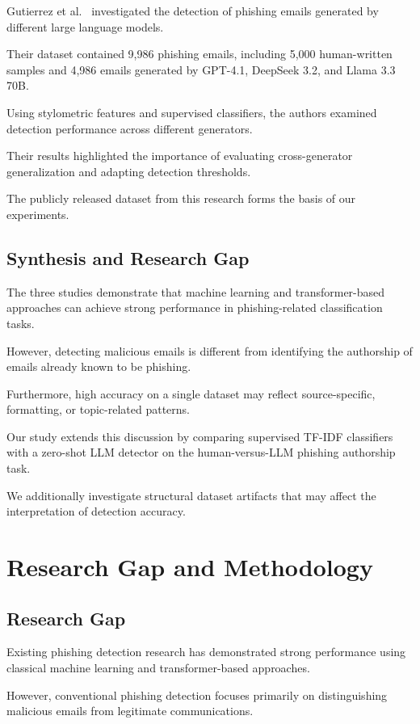 \documentclass[sigconf,nonacm]{acmart}
\begin{document}
Gutierrez et al.~\cite{gutierrez2026}
investigated the detection of phishing emails
generated by different large language models.

Their dataset contained 9,986 phishing emails,
including 5,000 human-written samples and
4,986 emails generated by GPT-4.1,
DeepSeek 3.2, and Llama 3.3 70B.

Using stylometric features and supervised
classifiers, the authors examined detection
performance across different generators.

Their results highlighted the importance
of evaluating cross-generator generalization
and adapting detection thresholds.

The publicly released dataset from this
research forms the basis of our experiments.

\subsection{Synthesis and Research Gap}

The three studies demonstrate that machine
learning and transformer-based approaches
can achieve strong performance in
phishing-related classification tasks.

However, detecting malicious emails is
different from identifying the authorship
of emails already known to be phishing.

Furthermore, high accuracy on a single
dataset may reflect source-specific,
formatting, or topic-related patterns.

Our study extends this discussion by
comparing supervised TF-IDF classifiers
with a zero-shot LLM detector on the
human-versus-LLM phishing authorship task.

We additionally investigate structural
dataset artifacts that may affect
the interpretation of detection accuracy.


\section{Research Gap and Methodology}

\subsection{Research Gap}

Existing phishing detection research has
demonstrated strong performance using
classical machine learning and
transformer-based approaches.

However, conventional phishing detection
focuses primarily on distinguishing malicious
emails from legitimate communications.
\end{document}
